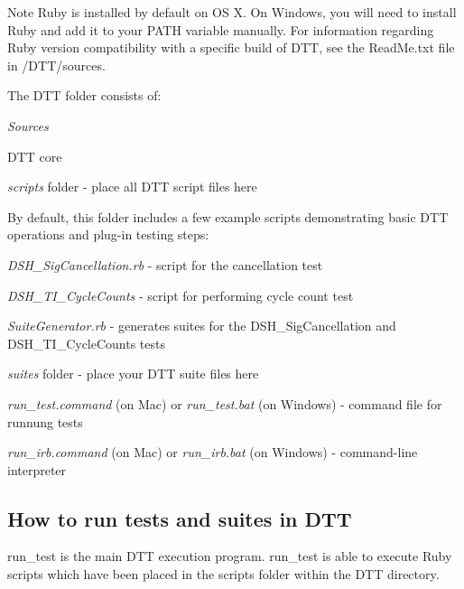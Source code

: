 \begin{DoxyNote}{Note}
Ruby is installed by default on OS X. On Windows, you will need to install Ruby and add it to your P\+A\+TH variable manually. For information regarding Ruby version compatibility with a specific build of D\+TT, see the Read\+Me.\+txt file in /\+D\+T\+T/sources.
\end{DoxyNote}
The D\+TT folder consists of\+: 
\begin{DoxyItemize}
\item {\itshape Sources} 
\begin{DoxyItemize}
\item D\+TT core 
\item {\itshape scripts} folder -\/ place all D\+TT script files here

By default, this folder includes a few example scripts demonstrating basic D\+TT operations and plug-\/in testing steps\+:


\begin{DoxyItemize}
\item {\itshape D\+S\+H\+\_\+\+Sig\+Cancellation.\+rb} -\/ script for the cancellation test  
\item {\itshape D\+S\+H\+\_\+\+T\+I\+\_\+\+Cycle\+Counts} -\/ script for performing cycle count test 
\item {\itshape Suite\+Generator.\+rb} -\/ generates suites for the D\+S\+H\+\_\+\+Sig\+Cancellation and D\+S\+H\+\_\+\+T\+I\+\_\+\+Cycle\+Counts tests 
\end{DoxyItemize}
\item {\itshape suites} folder -\/ place your D\+TT suite files here 
\end{DoxyItemize}
\item {\itshape run\+\_\+test.\+command} (on Mac) or {\itshape run\+\_\+test.\+bat} (on Windows) -\/ command file for runnung tests 
\item {\itshape run\+\_\+irb.\+command} (on Mac) or {\itshape run\+\_\+irb.\+bat} (on Windows) -\/ command-\/line interpreter 
\end{DoxyItemize}

 \hypertarget{a00836_dtt_guide_01_how_to_run_test_and_suites_in_dtt}{}\subsection{How to run tests and suites in D\+TT}\label{a00836_dtt_guide_01_how_to_run_test_and_suites_in_dtt}
 {\ttfamily run\+\_\+test} is the main D\+TT execution program. {\ttfamily run\+\_\+test} is able to execute Ruby scripts which have been placed in the scripts folder within the D\+TT directory.


